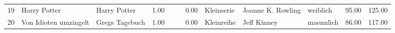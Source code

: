 \begin{table}
\begin{center}
{\begin{tabular}{rllrllrlllrr}
  19 & Harry Potter                                                                                                                                                                                                                                                    & Harry Potter                                                                                                                                                                                                                                                    & 1.00 &                                                                                                                                                                                                                                                                 &                                                                                                                                                                                                                                                                 & 0.00 & Kleinserie & Joanne K. Rowling                                                                                                                                                                                                                                               & weiblich & 95.00 & 125.00 \\ 
  20 & Von Idioten umzingelt                                                                                                                                                                                                                                           & Gregs Tagebuch                                                                                                                                                                                                                                                  & 1.00 &                                                                                                                                                                                                                                                                 &                                                                                                                                                                                                                                                                 & 0.00 & Kleinreihe & Jeff Kinney                                                                                                                                                                                                                                                     & maennlich & 86.00 & 117.00 \\ 

\end{tabular}}
\end{center}
\end{table}
